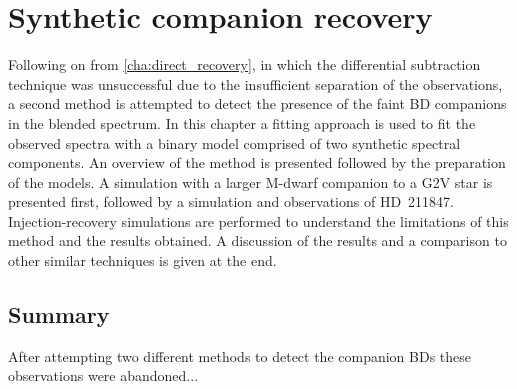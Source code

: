 
\chapter{Synthetic companion recovery}  %
\label{cha:model_comparison}

Following on from \cref{cha:direct_recovery}, in which the differential subtraction technique was unsuccessful due to the insufficient separation of the observations, a second method is attempted to detect the presence of the faint {BD} companions in the blended spectrum.
In this chapter a \textchisquared{} fitting approach is used to fit the observed spectra with a binary model comprised of two synthetic spectral components.
An overview of the method is presented followed by the preparation of the models.
A simulation with a larger M-dwarf companion to a G2V star is presented first, followed by a simulation and observations of {HD~211847}.
Injection-recovery simulations are performed to understand the limitations of this method and the results obtained.
A discussion of the results and a comparison to other similar techniques is given at the end.









\section{Summary}

After attempting two different methods to detect the companion BDs these observations were abandoned...
